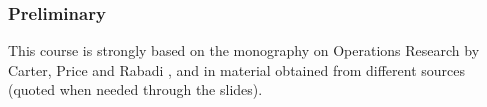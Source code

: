 \begin{frame}
    \frametitle{Preliminary}
    This course is strongly based on the monography on Operations Research by Carter, Price and Rabadi \cite{carter}, and in material obtained from different sources (quoted when needed through the slides).
\end{frame}